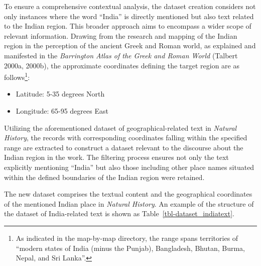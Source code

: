 \documentclass[
  12pt,
]{article}
\providecommand{\tightlist}{%
  \setlength{\itemsep}{0pt}\setlength{\parskip}{0pt}}\usepackage{longtable,booktabs,array}
\begin{document}
To ensure a comprehensive contextual analysis, the dataset creation
considers not only instances where the word ``India'' is directly
mentioned but also text related to the Indian region. This broader
approach aims to encompass a wider scope of relevant information.
Drawing from the research and mapping of the Indian region in the
perception of the ancient Greek and Roman world, as explained and
manifested in the \emph{Barrington Atlas of the Greek and Roman World}
(Talbert 2000a, 2000b), the approximate coordinates defining the target
region are as follows\footnote{As indicated in the map-by-map directory,
  the range spans territories of ``modern states of India (minus the
  Punjab), Bangladesh, Bhutan, Burma, Nepal, and Sri Lanka''.}:

\begin{itemize}
\tightlist
\item
  Latitude: 5-35 degrees North
\item
  Longitude: 65-95 degrees East
\end{itemize}

Utilizing the aforementioned dataset of geographical-related text in
\emph{Natural History}, the records with corresponding coordinates
falling within the specified range are extracted to construct a dataset
relevant to the discourse about the Indian region in the work. The
filtering process ensures not only the text explicitly mentioning
``India'' but also those including other place names situated within the
defined boundaries of the Indian region were retained.

The new dataset comprises the textual content and the geographical
coordinates of the mentioned Indian place in \emph{Natural History}. An
example of the structure of the dataset of India-related text is shown
as Table~\ref{tbl-dataset_indiatext}.
\end{document}
